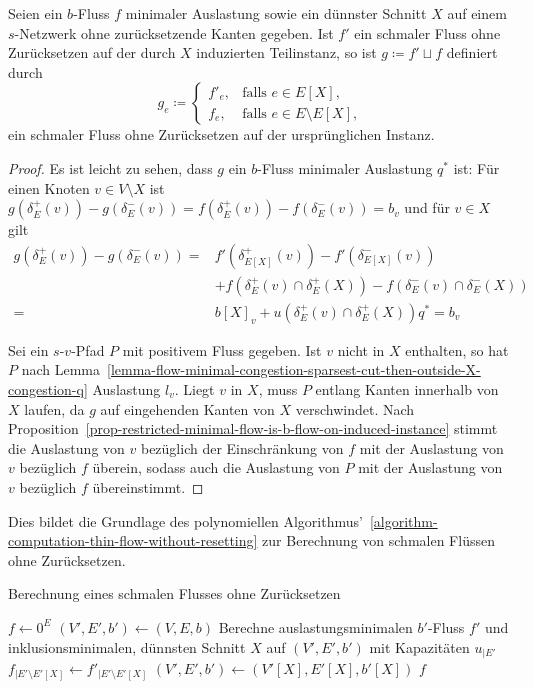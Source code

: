 \begin{corollary}\label{cor-thin-flow-alg-correct}
	Seien ein $b$-Fluss $f$ minimaler Auslastung sowie ein dünnster Schnitt $X$ auf einem $s$-Netzwerk ohne zurücksetzende Kanten gegeben.
	Ist $f'$ ein schmaler Fluss ohne Zurücksetzen auf der durch $X$ induzierten Teilinstanz, so ist $g \coloneq f' \sqcup f$ definiert durch \[
		g_e \coloneq \begin{cases}
			f'_e, & \text{falls $e\in E[X]$,} \\
			f_e, & \text{falls $e\in E\setminus E[X]$,}
		\end{cases}
	\] ein schmaler Fluss ohne Zurücksetzen auf der ursprünglichen Instanz.
\end{corollary}
\begin{proof}
	Es ist leicht zu sehen, dass $g$ ein $b$-Fluss minimaler Auslastung $q^*$ ist:
	Für einen Knoten $v \in V\setminus X$ ist $g(\delta^+_E(v)) - g(\delta^-_E(v)) = f(\delta^+_E(v)) - f(\delta^-_E(v)) = b_v$ und für $v\in X$ gilt
	\begin{align*}
	g(\delta^+_E(v)) - g(\delta^-_E(v)) =& f'(\delta^+_{E[X]}(v)) - f'(\delta^-_{E[X]}(v)) \\
	&+ f(\delta^+_E(v)\cap\delta^+_E(X)) - f(\delta^-_E(v)\cap\delta^-_E(X))
	\\=& b[X]_v + u(\delta^+_E(v)\cap\delta^+_E(X)) q^* = b_v
	\end{align*}

	Sei ein $s$-$v$-Pfad $P$ mit positivem Fluss gegeben.
	Ist $v$ nicht in $X$ enthalten, so hat $P$ nach Lemma~\ref{lemma-flow-minimal-congestion-sparsest-cut-then-outside-X-congestion-q} Auslastung $l_v$.
	Liegt $v$ in $X$, muss $P$ entlang Kanten innerhalb von $X$ laufen, da $g$ auf eingehenden Kanten von $X$ verschwindet.
	Nach Proposition~\ref{prop-restricted-minimal-flow-is-b-flow-on-induced-instance} stimmt die Auslastung von $v$ bezüglich der Einschränkung von $f$ mit der Auslastung von $v$ bezüglich $f$ überein, sodass auch die Auslastung von $P$ mit der Auslastung von $v$ bezüglich $f$ übereinstimmt.
\end{proof}

Dies bildet die Grundlage des polynomiellen Algorithmus'~\ref{algorithm-computation-thin-flow-without-resetting} zur Berechnung von schmalen Flüssen ohne Zurücksetzen.

\begin{algorithm}
\caption{Berechnung eines schmalen Flusses ohne Zurücksetzen}
\label{algorithm-computation-thin-flow-without-resetting}
\begin{algorithmic}[1]
	\State $f \gets 0^E$
	\State $(V', E', b') \gets (V, E, b)$
	\State Berechne auslastungsminimalen $b'$-Fluss $f'$ und inklusionsminimalen, 
	\Statex  dünnsten Schnitt $X$ auf $(V', E', b')$ mit Kapazitäten $u_{\mid E'}$
	\State $f_{\mid E'\setminus E'[X]} \gets f'_{\mid E'\setminus E'[X]}$
	\State $(V', E', b') \gets (V'[X], E'[X], b'[X])$
	\EndWhile
	\State\Return $f$
	\EndProcedure
\end{algorithmic}
\end{algorithm}

